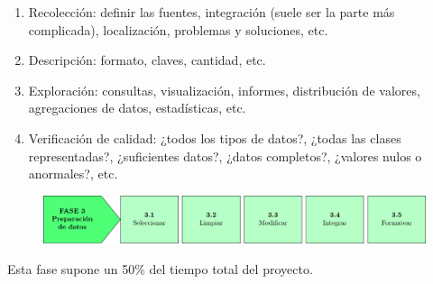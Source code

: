 \begin{enumerate}[label=2.\arabic*]
\item Recolección: definir las fuentes, integración (suele ser la parte más complicada), localización, problemas y soluciones, etc.
\item Descripción: formato, claves, cantidad, etc.
\item Exploración: consultas, visualización, informes, distribución de valores, agregaciones de datos, estadísticas, etc.
\item Verificación de calidad: ¿todos los tipos de datos?, ¿todas las clases representadas?, ¿suficientes datos?, ¿datos completos?, ¿valores nulos o anormales?, etc.
\end{enumerate}


\begin{figure}[H]
\centering
\includegraphics[width=\textwidth]{fotos/15.pdf}
\end{figure}

\noindent Esta fase supone un 50\% del tiempo total del proyecto.

